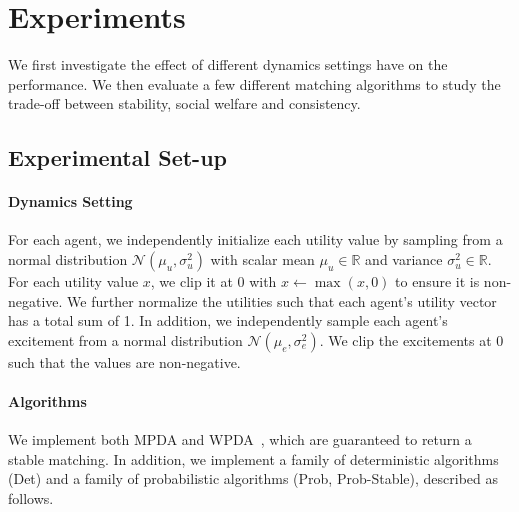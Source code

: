 \section{Experiments}
We first investigate the effect of different dynamics settings have on the performance. We then evaluate a few different matching algorithms to study the trade-off between stability, social welfare and consistency.
\subsection{Experimental Set-up}
\paragraph{Dynamics Setting} For each agent, we independently initialize each utility value by sampling from a normal distribution $\mathcal{N}(\mu_u, \sigma_u^2)$ with scalar mean $\mu_u \in \mathbb{R}$ and variance $\sigma_u^2 \in \mathbb{R}$. For each utility value $x$, we clip it at 0 with $x \leftarrow \max(x, 0)$ to ensure it is non-negative. We further normalize the utilities such that each agent's utility vector has a total sum of 1. In addition, we independently sample each agent's excitement from a normal distribution $\mathcal{N}(\mu_e, \sigma_e^2)$. We clip the excitements at 0 such that the values are non-negative.

\paragraph{Algorithms} We implement both MPDA and WPDA~\cite{galeshapley1962}, which are guaranteed to return a stable matching. In addition, we implement a family of deterministic algorithms (Det) and a family of probabilistic algorithms (Prob, Prob-Stable), described as follows.

